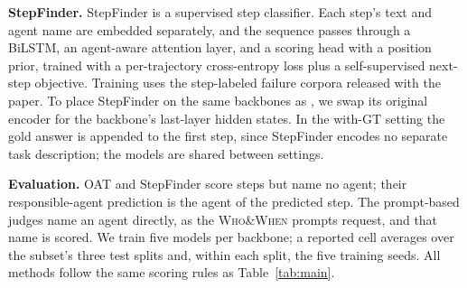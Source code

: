 \textbf{StepFinder.}
StepFinder is a supervised step classifier. Each step's text and agent name are embedded separately, and the sequence passes through a BiLSTM, an agent-aware attention layer, and a scoring head with a position prior, trained with a per-trajectory cross-entropy loss plus a self-supervised next-step objective. Training uses the step-labeled failure corpora released with the paper. To place StepFinder on the same backbones as \soap{}, we swap its original encoder for the backbone's last-layer hidden states. In the with-GT setting the gold answer is appended to the first step, since StepFinder encodes no separate task description; the models are shared between settings.

\textbf{Evaluation.}
OAT and StepFinder score steps but name no agent; their responsible-agent prediction is the agent of the predicted step. The prompt-based judges name an agent directly, as the \textsc{Who\&When} prompts request, and that name is scored. We train five models per backbone; a reported cell averages over the subset's three test splits and, within each split, the five training seeds. All methods follow the same scoring rules as Table~\ref{tab:main}. 


